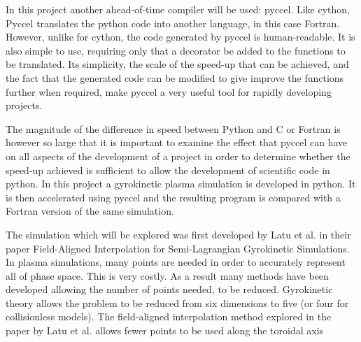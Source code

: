 In this project another ahead-of-time compiler will be used: pyccel. Like cython, Pyccel translates the python code into another language, in this case Fortran. However, unlike for cython, the code generated by pyccel is human-readable. It is also simple to use, requiring only that a decorator be added to the functions to be translated. Its simplicity, the scale of the speed-up that can be achieved, and the fact that the generated code can be modified to give improve the functions further when required, make pyccel a very useful tool for rapidly developing projects.

The magnitude of the difference in speed between Python and C or Fortran is however so large that it is important to examine the effect that pyccel can have on all aspects of the development of a project in order to determine whether the speed-up achieved is sufficient to allow the development of scientific code in python. In this project a gyrokinetic plasma simulation is developed in python. It is then accelerated using pyccel and the resulting program is compared with a Fortran version of the same simulation.

The simulation which will be explored was first developed by Latu et al. \cite{YamanPaper} in their paper Field-Aligned Interpolation for Semi-Lagrangian Gyrokinetic Simulations. In plasma simulations, many points are needed in order to accurately represent all of phase space. This is very costly. As a result many methods have been developed allowing the number of points needed, to be reduced. Gyrokinetic theory allows the problem to be reduced from six dimensions to five (or four for collisionless models). The field-aligned interpolation method explored in the paper by Latu et al. allows fewer points to be used along the toroidal axis

